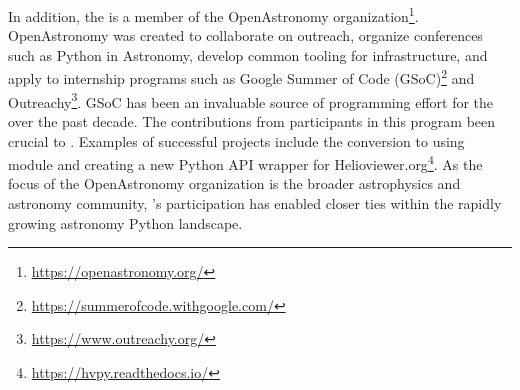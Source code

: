 In addition, the \sunpyproj is a member of the OpenAstronomy organization\footnote{\url{https://openastronomy.org/}}.
OpenAstronomy was created to collaborate on outreach, organize conferences such as Python in Astronomy, develop common tooling for infrastructure, and apply to internship programs such as Google Summer of Code (GSoC)\footnote{\url{https://summerofcode.withgoogle.com/}} and Outreachy\footnote{\url{https://www.outreachy.org/}}.
GSoC has been an invaluable source of programming effort for the \sunpyproj over the past decade.
The contributions from participants in this program been crucial to \sunpypkg.
Examples of successful projects include the conversion to using  module and creating a new Python API wrapper for Helioviewer.org\footnote{\url{https://hvpy.readthedocs.io/}}.
As the focus of the OpenAstronomy organization is the broader astrophysics and astronomy community, \sunpyproj's participation has enabled closer ties within the rapidly growing astronomy Python landscape.
